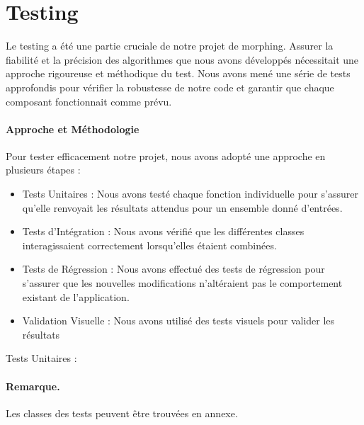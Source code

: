 \section{Testing}
Le testing a été une partie cruciale de notre projet de morphing. Assurer la fiabilité et la précision des algorithmes que nous avons développés nécessitait une approche rigoureuse et méthodique du test. Nous avons mené une série de tests approfondis pour vérifier la robustesse de notre code et garantir que chaque composant fonctionnait comme prévu.
\paragraph{Approche et Méthodologie} Pour tester efficacement notre projet, nous avons adopté une approche en plusieurs étapes :
\begin{itemize}
    \item Tests Unitaires : Nous avons testé chaque fonction individuelle pour s'assurer qu'elle renvoyait les résultats attendus pour un ensemble donné d'entrées.
    \item Tests d'Intégration : Nous avons vérifié que les différentes classes interagissaient correctement lorsqu'elles étaient combinées.
    \item Tests de Régression : Nous avons effectué des tests de régression pour s'assurer que les nouvelles modifications n'altéraient pas le comportement existant de l'application.
    \item Validation Visuelle : Nous avons utilisé des tests visuels pour valider les résultats
\end{itemize}Tests Unitaires :

\paragraph{Remarque.} Les classes des tests peuvent être trouvées en annexe.


